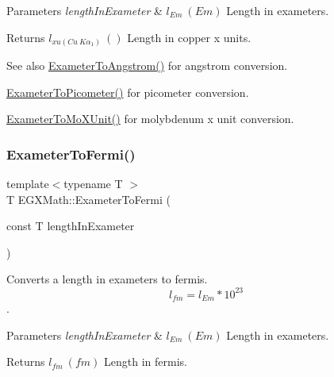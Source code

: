 \begin{DoxyParams}{Parameters}
{\em length\+In\+Exameter} & $ l_{Em}\ (Em)$ Length in exameters. \\
\hline
\end{DoxyParams}
\begin{DoxyReturn}{Returns}
$ l_{xu(Cu\ K\alpha_1)}\ ()$ Length in copper x units. 
\end{DoxyReturn}
\begin{DoxySeeAlso}{See also}
\mbox{\hyperlink{group___e_g_x_math-_conversions-_length_conversions-_exameter-_non-_s_i_ga24d2ee057470ce37f99d31451e010a22}{Exameter\+To\+Angstrom()}} for angstrom conversion. 

\mbox{\hyperlink{group___e_g_x_math-_conversions-_length_conversions-_exameter-_s_i_gaf524e8324fedf2eb61d43ce1dc36bcac}{Exameter\+To\+Picometer()}} for picometer conversion. 

\mbox{\hyperlink{group___e_g_x_math-_conversions-_length_conversions-_exameter-_non-_s_i_gadf73e46609660df6b7ae77ec7241183e}{Exameter\+To\+Mo\+X\+Unit()}} for molybdenum x unit conversion. 
\end{DoxySeeAlso}
\mbox{\label{group___e_g_x_math-_conversions-_length_conversions-_exameter-_non-_s_i_ga0aa0524461cbce1fcc102b847545d212}} 
\subsubsection{\texorpdfstring{Exameter\+To\+Fermi()}{ExameterToFermi()}}
{\footnotesize\ttfamily template$<$typename T $>$ \\
T E\+G\+X\+Math\+::\+Exameter\+To\+Fermi (\begin{DoxyParamCaption}\item[{const T}]{length\+In\+Exameter }\end{DoxyParamCaption})}



Converts a length in exameters to fermis. \[ l_{fm}=l_{Em} * 10^{23} \]. 


\begin{DoxyParams}{Parameters}
{\em length\+In\+Exameter} & $ l_{Em}\ (Em)$ Length in exameters. \\
\hline
\end{DoxyParams}
\begin{DoxyReturn}{Returns}
$ l_{fm}\ (fm)$ Length in fermis. 
\end{DoxyReturn}
\mbox{\label{group___e_g_x_math-_conversions-_length_conversions-_exameter-_non-_s_i_ga3356bb6585e02757a196b299c29660c1}} 
